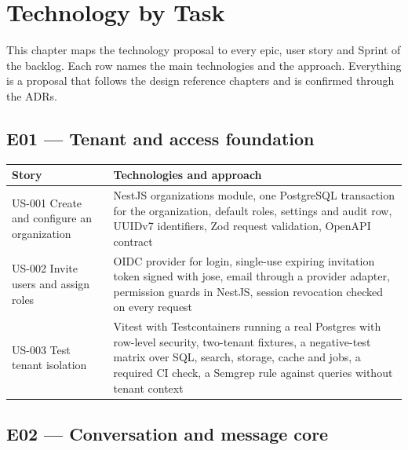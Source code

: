 \chapter{Technology by Task}

This chapter maps the technology proposal to every epic, user story and Sprint of the backlog. Each row names the main technologies and the approach. Everything is a proposal that follows the design reference chapters and is confirmed through the ADRs.

\section{E01 --- Tenant and access foundation}

{\small
\begin{longtable}{@{}>{\raggedright\arraybackslash}p{}>{\raggedright\arraybackslash}p{}@{}}
\toprule
\textbf{Story} & \textbf{Technologies and approach} \\
\midrule
\endhead
\bottomrule
\endfoot
US-001 Create and configure an organization & NestJS organizations module, one PostgreSQL transaction for the organization, default roles, settings and audit row, UUIDv7 identifiers, Zod request validation, OpenAPI contract \\
US-002 Invite users and assign roles & OIDC provider for login, single-use expiring invitation token signed with jose, email through a provider adapter, permission guards in NestJS, session revocation checked on every request \\
US-003 Test tenant isolation & Vitest with Testcontainers running a real Postgres with row-level security, two-tenant fixtures, a negative-test matrix over SQL, search, storage, cache and jobs, a required CI check, a Semgrep rule against queries without tenant context \\
\end{longtable}
}

\section{E02 --- Conversation and message core}

